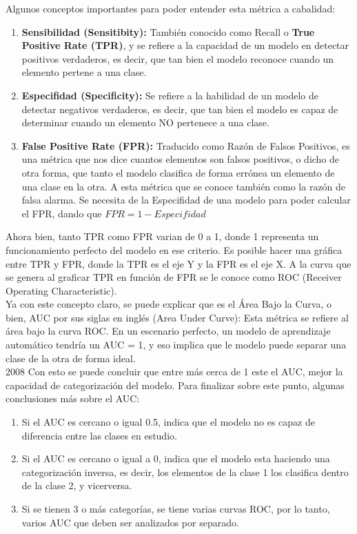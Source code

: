 \documentclass[english]{article}
\begin{document}
\begin{enumerate}
\begin{enumerate}
Algunos conceptos importantes para poder entender esta m\'{e}trica a cabalidad:
\begin{enumerate}
    \item \textbf{Sensibilidad (Sensitibity):} Tambi\'{e}n conocido como Recall o \textbf{True Positive Rate (TPR)}, y se refiere a la capacidad de un modelo en detectar positivos verdaderos, es decir, que tan bien el modelo reconoce cuando un elemento pertene a una clase.
    \item \textbf{Especifidad (Specificity):} Se refiere a la habilidad de un modelo de detectar negativos verdaderos, es decir, que tan bien el modelo es capaz de determinar cuando un elemento NO pertenece a una clase.
    \item \textbf{False Positive Rate (FPR):} Traducido como Raz\'{o}n de Falsos Positivos, es una m\'{e}trica que nos dice cuantos elementos son falsos positivos, o dicho de otra forma, que tanto el modelo clasifica de forma err\'{o}nea un elemento de una clase en la otra. A esta m\'{e}trica que se conoce tambi\'{e}n como la raz\'{o}n de falsa alarma. Se necesita de la Especifidad de una modelo para poder calcular el FPR, dando que $FPR = 1 - Especifidad$\\
\end{enumerate}

Ahora bien, tanto TPR como FPR varian de 0 a 1, donde 1 representa un funcionamiento perfecto del modelo en ese criterio. Es posible hacer una gr\'afica entre TPR y FPR, donde la TPR es el eje Y y la FPR es el eje X. A la curva que se genera al graficar TPR en funci\'{o}n de FPR se le conoce como ROC (Receiver Operating Characteristic).\\

Ya con este concepto claro, se puede explicar que es el \'{A}rea Bajo la Curva, o bien, AUC por sus siglas en ingl\'{e}s (Area Under Curve): Esta m\'{e}trica se refiere al \'{a}rea bajo la curva ROC. En un escenario perfecto, un modelo de aprendizaje autom\'{a}tico tendr\'{i}a un AUC = 1, y eso implica que le modelo puede separar una clase de la otra de forma ideal.\\

2008
Con esto se puede concluir que entre m\'{a}s cerca de 1 este el AUC, mejor la capacidad de categorizaci\'{o}n del modelo. Para finalizar sobre este punto, algunas conclusiones m\'{a}s sobre el AUC:
\begin{enumerate}
    \item Si el AUC es cercano o igual 0.5, indica que el modelo no es capaz de diferencia entre las clases en estudio.
    \item Si el AUC es cercano o igual a 0, indica que el modelo esta haciendo una categorizaci\'{o}n inversa, es decir, los elementos de la clase 1 los clasifica dentro de la clase 2, y vicerversa.
    \item Si se tienen 3 o m\'{a}s categor\'{i}as, se tiene varias curvas ROC, por lo tanto, varios AUC que deben ser analizados por separado.\\
\end{enumerate}


\end{enumerate}
\end{enumerate}
\end{document}
